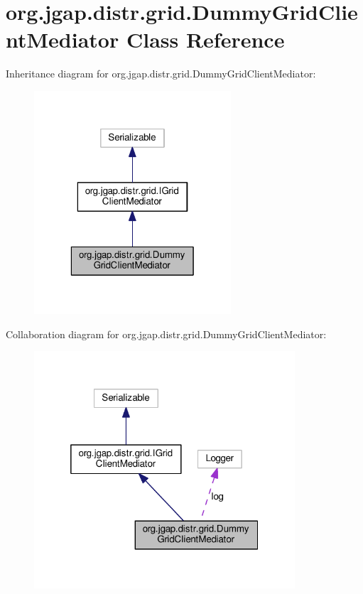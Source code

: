 \hypertarget{classorg_1_1jgap_1_1distr_1_1grid_1_1_dummy_grid_client_mediator}{\section{org.\-jgap.\-distr.\-grid.\-Dummy\-Grid\-Client\-Mediator Class Reference}
\label{classorg_1_1jgap_1_1distr_1_1grid_1_1_dummy_grid_client_mediator}
}


Inheritance diagram for org.\-jgap.\-distr.\-grid.\-Dummy\-Grid\-Client\-Mediator\-:
\nopagebreak
\begin{figure}[H]
\begin{center}
\leavevmode
\includegraphics[width=208pt]{classorg_1_1jgap_1_1distr_1_1grid_1_1_dummy_grid_client_mediator__inherit__graph}
\end{center}
\end{figure}


Collaboration diagram for org.\-jgap.\-distr.\-grid.\-Dummy\-Grid\-Client\-Mediator\-:
\nopagebreak
\begin{figure}[H]
\begin{center}
\leavevmode
\includegraphics[width=275pt]{classorg_1_1jgap_1_1distr_1_1grid_1_1_dummy_grid_client_mediator__coll__graph}
\end{center}
\end{figure}
